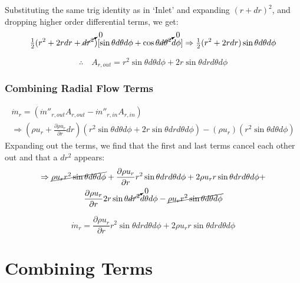 \documentclass[12pt, letterpaper, twoside]{article}
\begin{document}
            Substituting the same trig identity as in `Inlet' and expanding \((r + dr)^2\), and dropping higher order differential terms, we get:
            \begin{equation*}
                \tfrac{1}{2} (r^2 + 2rdr + \cancelto{0}{dr^2}) [\sin\theta d\theta d\phi + \cos\theta \cancelto{0}{d\theta^2} d\phi]
                \Rightarrow \tfrac{1}{2} (r^2 + 2rdr) \sin\theta d\theta d\phi
            \end{equation*}

            \begin{equation}
                \therefore\quad A_{r,out} = r^2 \sin\theta d\theta d\phi + 
                2r\sin\theta drd\theta d\phi
                \label{eq:Arout_final}
            \end{equation}

        \subsubsection{Combining Radial Flow Terms}
            \begin{multline*}
                \dot{m}_r = (\dot{m}''_{r,out} A_{r,out} - \dot{m}''_{r,in} A_{r,in}) 
                \\\Rightarrow
                \left(\rho u_r  + \frac{\partial \rho u_r}{\partial r} dr\right)\left(r^2 \sin\theta d\theta d\phi + 2r\sin\theta dr d\theta d\phi\right) -
                \left(\rho u_r\right)\left(r^2 \sin\theta d\theta d\phi\right)
            \end{multline*}
            Expanding out the terms, we find that the first and last terms cancel each other out and that a \(dr^2\) appears:
            \begin{multline*}
                \Rightarrow
                \cancel{\rho u_r r^2 \sin\theta d\theta d\phi} +
                \frac{\partial \rho u_r}{\partial r} r^2 \sin\theta dr d\theta d\phi +
                2\rho u_r r\sin\theta dr d\theta d\phi + \\
                \frac{\partial \rho u_r}{\partial r} 2r\sin\theta \cancelto{0}{dr^2} d\theta d\phi - 
                \cancel{\rho u_r r^2 \sin\theta d\theta d\phi}
            \end{multline*}

            \begin{equation}
                \dot{m}_r = \frac{\partial \rho u_r}{\partial r} r^2 \sin\theta dr d\theta d\phi +
                2\rho u_r r\sin\theta dr d\theta d\phi
                \label{eq:mdotr}
            \end{equation}


\section{Combining Terms} \label{sect:combineterms}
\end{document}
